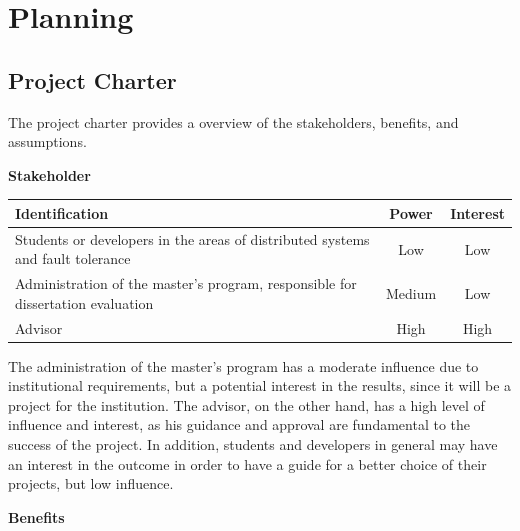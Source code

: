 % 
\chapter{Planning} %


\section{Project Charter}

The project charter provides a overview of the stakeholders, benefits, and assumptions.

\noindent \textbf{Stakeholder}

\begin{table}[h!]
      \centering
      \begin{tabular}{|p{11cm}|c|c|}
            \hline
            \textbf{Identification}                                                         & \textbf{Power} & \textbf{Interest} \\ \hline
            Students or developers in the areas of distributed systems and fault tolerance  & Low            & Low               \\ \hline
            Administration of the master's program, responsible for dissertation evaluation & Medium         & Low               \\ \hline
            Advisor                                                                         & High           & High              \\ \hline
      \end{tabular}
\end{table}

The administration of the master's program has a moderate influence due to institutional requirements, but a potential interest in the results, since it will be a project for the institution. The advisor, on the other hand, has a high level of influence and interest, as his guidance and approval are fundamental to the success of the project. In addition, students and developers in general may have an interest in the outcome in order to have a guide for a better choice of their projects, but low influence.

\textbf{Benefits}

